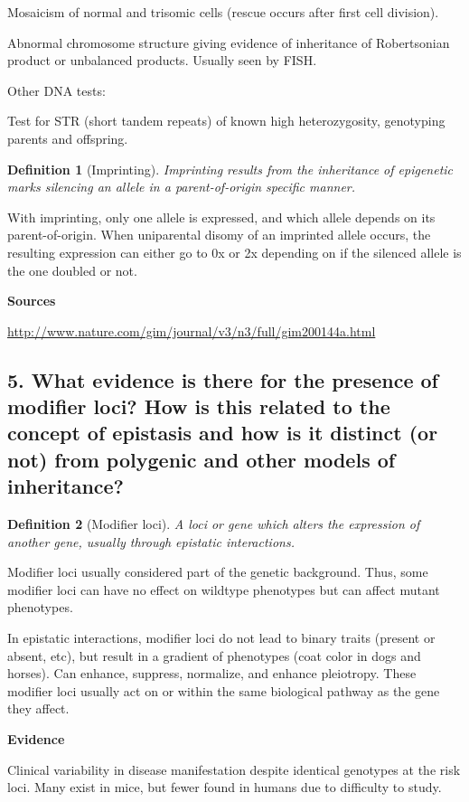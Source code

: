 \documentclass{tufte-handout}
\theoremstyle{noparens}
\newtheorem*{define}{Definition}
\begin{document}
 Mosaicism of normal and trisomic cells (rescue occurs after first cell division).
 
 Abnormal chromosome structure giving evidence of inheritance of Robertsonian product or unbalanced products. Usually seen by FISH.
 
 Other DNA tests:
 
 Test for STR (short tandem repeats) of known high heterozygosity, genotyping parents and offspring. 

\begin{define}[Imprinting]
Imprinting results from the inheritance of epigenetic marks silencing an allele in a parent-of-origin specific manner.
\end{define}

With imprinting, only one allele is expressed, and which allele depends on its parent-of-origin. When uniparental disomy of an imprinted allele occurs, the resulting expression can either go to 0x or 2x depending on if the silenced allele is the one doubled or not.

 \textbf{Sources}
 
 \url{http://www.nature.com/gim/journal/v3/n3/full/gim200144a.html}
 
\newpage
\subsection{5. What evidence is there for the presence of modifier loci? How is this related to the concept of epistasis and how is it distinct (or not) from polygenic and other models of inheritance?}
\label{subsec:05}

\begin{define}[Modifier loci]
A loci or gene which alters the expression of another gene, usually through epistatic interactions.
\end{define}

Modifier loci usually considered part of the genetic background. Thus, some modifier loci can have no effect on wildtype phenotypes but can affect mutant phenotypes.

In epistatic interactions, modifier loci do not lead to binary traits (present or absent, etc), but result in a gradient of phenotypes (coat color in dogs and horses). Can enhance, suppress, normalize, and enhance pleiotropy. These modifier loci usually act on or within the same biological pathway as the gene they affect.

\noindent
\textbf{Evidence}

Clinical variability in disease manifestation despite identical genotypes at the risk loci. Many exist in mice, but fewer found in humans due to difficulty to study.
\end{document}
